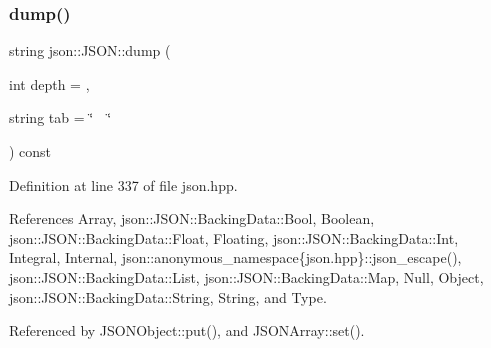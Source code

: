 \subsubsection{\texorpdfstring{dump()}{dump()}}
{\footnotesize\ttfamily string json\+::\+J\+S\+O\+N\+::dump (\begin{DoxyParamCaption}\item[{int}]{depth = {},  }\item[{string}]{tab = {\ttfamily \char`\"{}~~\char`\"{}} }\end{DoxyParamCaption}) const\hspace{0.3cm}{\ttfamily [inline]}}



Definition at line 337 of file json.\+hpp.



References Array, json\+::\+J\+S\+O\+N\+::\+Backing\+Data\+::\+Bool, Boolean, json\+::\+J\+S\+O\+N\+::\+Backing\+Data\+::\+Float, Floating, json\+::\+J\+S\+O\+N\+::\+Backing\+Data\+::\+Int, Integral, Internal, json\+::anonymous\+\_\+namespace\{json.\+hpp\}\+::json\+\_\+escape(), json\+::\+J\+S\+O\+N\+::\+Backing\+Data\+::\+List, json\+::\+J\+S\+O\+N\+::\+Backing\+Data\+::\+Map, Null, Object, json\+::\+J\+S\+O\+N\+::\+Backing\+Data\+::\+String, String, and Type.



Referenced by J\+S\+O\+N\+Object\+::put(), and J\+S\+O\+N\+Array\+::set().


